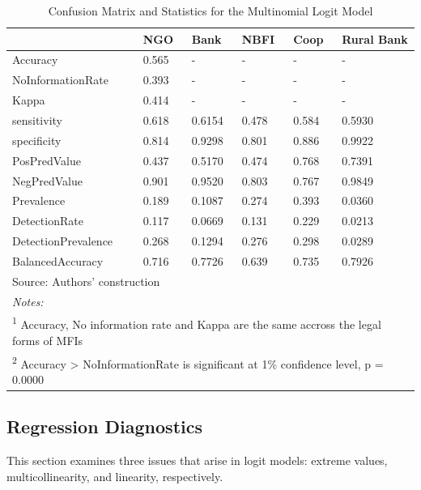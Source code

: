 \documentclass[a4paper, nobind]{templates/ociamthesis}
\begin{document}
\begin{table}

\caption{\label{tab:unnamed-chunk-36}Confusion Matrix and Statistics for the Multinomial Logit Model}
\centering
\fontsize{9}{11}\selectfont
\begin{tabular}[t]{llllll}
\toprule
  & NGO & Bank & NBFI & Coop & Rural Bank\\
\midrule
Accuracy & 0.565 & - & - & - & -\\
NoInformationRate & 0.393 & - & - & - & -\\
Kappa & 0.414 & - & - & - & -\\
sensitivity & 0.618 & 0.6154 & 0.478 & 0.584 & 0.5930\\
specificity & 0.814 & 0.9298 & 0.801 & 0.886 & 0.9922\\
\addlinespace
PosPredValue & 0.437 & 0.5170 & 0.474 & 0.768 & 0.7391\\
NegPredValue & 0.901 & 0.9520 & 0.803 & 0.767 & 0.9849\\
Prevalence & 0.189 & 0.1087 & 0.274 & 0.393 & 0.0360\\
DetectionRate & 0.117 & 0.0669 & 0.131 & 0.229 & 0.0213\\
DetectionPrevalence & 0.268 & 0.1294 & 0.276 & 0.298 & 0.0289\\
\addlinespace
BalancedAccuracy & 0.716 & 0.7726 & 0.639 & 0.735 & 0.7926\\
\bottomrule
\multicolumn{6}{l}{\rule{0pt}{1em}Source: Authors' construction}\\
\multicolumn{6}{l}{\rule{0pt}{1em}\textit{Notes: }}\\
\multicolumn{6}{l}{\rule{0pt}{1em}\textsuperscript{1} Accuracy, No information rate and Kappa are the same accross the legal forms of MFIs}\\
\multicolumn{6}{l}{\rule{0pt}{1em}\textsuperscript{2} Accuracy > NoInformationRate is significant at 1\% confidence level, p = 0.0000}\\
\end{tabular}
\end{table}

\newpage

\hypertarget{regression-diagnostics}{%
\subsection{Regression Diagnostics}\label{regression-diagnostics}}

This section examines three issues that arise in logit models: extreme values, multicollinearity, and linearity, respectively.
\end{document}
